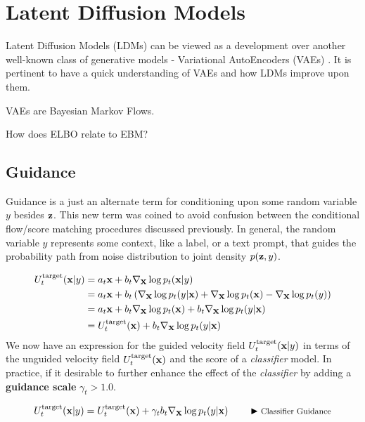 \documentclass[a4paper, 11pt]{article}
\begin{document}
\section{Latent Diffusion Models}

Latent Diffusion Models (LDMs) can be viewed as a development over another well-known class of generative models - Variational AutoEncoders (VAEs) \cite{dieleman2023perspectives}. It is pertinent to have a quick understanding of VAEs and how LDMs improve upon them.

VAEs are Bayesian Markov Flows.

How does ELBO relate to EBM? 


\subsection{Guidance}

Guidance is a just an alternate term for conditioning upon some random variable $y$ besides $\mbox{$\mbox{$\mathbf{z}$}$}$. This new term was coined to avoid confusion between the conditional flow/score matching procedures discussed previously. In general, the random variable $y$ represents some context, like a label, or a text prompt, that guides the probability path from noise distribution to joint density $p(\mbox{$\mbox{$\mathbf{z}$}$}, y)$. 

\begin{align}
    U_t^{\text{target}}(\mbox{$\mbox{$\mathbf{x}$}$} | y) &= a_t \mbox{$\mbox{$\mathbf{x}$}$} + b_t \nabla_{\mbox{$\mbox{$\mathbf{x}$}$}} \log p_t(\mbox{$\mbox{$\mathbf{x}$}$} | y) \\
    &= a_t \mbox{$\mbox{$\mathbf{x}$}$} + b_t  \left ( \nabla_{\mbox{$\mbox{$\mathbf{x}$}$}}\log p_t( y | \mbox{$\mbox{$\mathbf{x}$}$}) + \nabla_{\mbox{$\mbox{$\mathbf{x}$}$}}\log p_t(\mbox{$\mbox{$\mathbf{x}$}$}) - \nabla_{\mbox{$\mbox{$\mathbf{x}$}$}}\log p_t(y) \right) \\
    &= a_t \mbox{$\mbox{$\mathbf{x}$}$} + b_t \nabla_{\mbox{$\mbox{$\mathbf{x}$}$}}\log p_t(\mbox{$\mbox{$\mathbf{x}$}$}) + b_t \nabla_{\mbox{$\mbox{$\mathbf{x}$}$}}\log p_t( y | \mbox{$\mbox{$\mathbf{x}$}$})   \\
    &= U_t^{\text{target}}(\mbox{$\mbox{$\mathbf{x}$}$}) + b_t \nabla_{\mbox{$\mbox{$\mathbf{x}$}$}}\log p_t( y | \mbox{$\mbox{$\mathbf{x}$}$})
\end{align}
We now have an expression for the guided velocity field $U_t^{\text{target}}(\mbox{$\mbox{$\mathbf{x}$}$} | y)$ in terms of the unguided velocity field $U_t^{\text{target}}(\mbox{$\mbox{$\mathbf{x}$}$})$ and the score of a \emph{classifier} model. In practice, if it desirable to further enhance the effect of the \emph{classifier} by adding a \textbf{guidance scale} $\gamma_t > 1.0$.

\begin{align}
    U_t^{\text{target}}(\mbox{$\mbox{$\mathbf{x}$}$} | y)  = U_t^{\text{target}}(\mbox{$\mbox{$\mathbf{x}$}$}) + \gamma_t b_t \nabla_{\mbox{$\mbox{$\mathbf{x}$}$}}\log p_t( y | \mbox{$\mbox{$\mathbf{x}$}$}) \qquad \blacktriangleright\text{\footnotesize Classifier Guidance} \label{eq:class-guidance}
\end{align}
\end{document}

